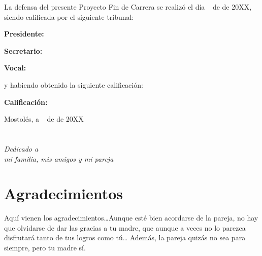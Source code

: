 \documentclass[a4paper, 12pt]{book}
\begin{document}
\vspace{1cm}
La defensa del presente Proyecto Fin de Carrera se realizó el día \qquad$\;\,$ de \qquad\qquad\qquad\qquad \newline de 20XX, siendo calificada por el siguiente tribunal:


\vspace{0.5cm}
\textbf{Presidente:}

\vspace{1.2cm}
\textbf{Secretario:}

\vspace{1.2cm}
\textbf{Vocal:}


\vspace{1.2cm}
y habiendo obtenido la siguiente calificación:

\vspace{1cm}
\textbf{Calificación:}


\vspace{1cm}
\begin{flushright}
Mostolés, a \qquad$\;\,$ de \qquad\qquad\qquad\qquad de 20XX
\end{flushright}


\chapter*{}
\begin{flushright}
\textit{Dedicado a \\
mi familia, mis amigos y mi pareja}
\end{flushright}


\chapter*{Agradecimientos}

Aquí vienen los agradecimientos\ldots Aunque esté bien acordarse de la pareja, no hay que olvidarse de dar las gracias a tu madre, que aunque a veces no lo parezca disfrutará tanto de tus logros como tú\ldots
Además, la pareja quizás no sea para siempre, pero tu madre sí.
\end{document}
